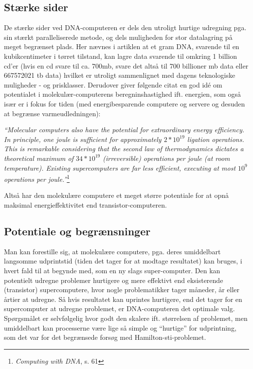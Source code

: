 \documentclass[10pt,a4paper]{article}
\newcommand{\citat}[2]{\begin{justify}\textit{``#1''}\hspace{0.1cm}\footnote{#2}\end{justify}}
\begin{document}
\subsection{Stærke sider}
De stærke sider ved DNA-computeren er dels den utroligt hurtige udregning pga. 
sin stærkt paralleliserede metode, og dels muligheden for stor datalagring på
meget begrænset plads. Her nævnes i artiklen at et gram DNA, svarende til en 
kubikcentimeter i tørret tilstand, kan lagre data svarende til omkring 1
billion cd'er (hvis en cd svare til ca. 700mb, svare det altså til 700 billioner
mb data eller 667572021 tb data) hvilket er utroligt sammenlignet med dagens
teknologiske muligheder - og prisklasser. Derudover giver følgende citat en god 
idé om potentialet i molekulær-computerens beregninshastighed ift. energien, 
som også især er i fokus for tiden (med energibesparende computere og servere 
og desuden at begrænse varmeudledningen):
\citat{Molecular computers also have the potential for extraordinary energy 
efficiency. In principle, one joule is sufficient for approximately $2*10^{19}$ 
ligation operations. This is remarkable considering that the second law of 
thermodynamics dictates a theoretical maximum of $34*10^{19}$ (irreversible) 
operations per joule (at room temperature). Existing supercomputers are far
less efficient, executing at most $10^{9}$ operations per
joule.}{\textit{Computing with DNA}, s. 61}

Altså har den molekulære computere et meget større potentiale for at opnå 
maksimal energieffektivitet end transistor-computeren.

\subsection{Potentiale og begrænsninger}
Man kan forestille sig, at molekulære computere, pga. deres umiddelbart 
langsomme udprintstid (tiden det tager for at modtage resultatet) kan bruges, i 
hvert fald til at begynde med, som en ny slags super-computer. Den kan 
potentielt udregne problemer hurtigere og mere effektivt end eksisterende
(transistor) supercomputere, hvor nogle problematikker tager måneder, år eller
årtier at udregne. Så hvis resultatet kan uprintes hurtigere, end det tager for
en supercomputer at udregne problemet, er DNA-computeren det optimale valg.
Spørgsmålet er selvfølgelig hvor godt den skalere ift. størrelsen af problemet,
men umiddelbart kan processerne være lige så simple og ``hurtige'' for
udprintning, som det var for det begrænsede forsøg med Hamilton-sti-problemet.
\end{document}

